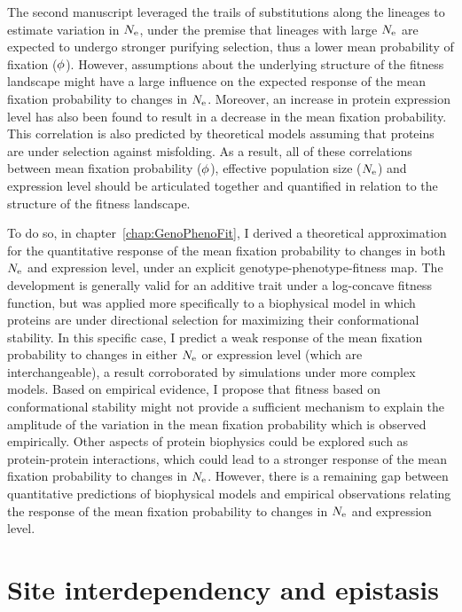The second manuscript leveraged the trails of substitutions along the lineages to estimate variation in $N_{\textrm{e}}$, under the premise that lineages with large $N_{\textrm{e}}$ are expected to undergo stronger purifying selection, thus a lower mean probability of fixation ($\phi$).
However, assumptions about the underlying structure of the fitness landscape might have a large influence on the expected response of the mean fixation probability to changes in $N_{\textrm{e}}$.
Moreover, an increase in protein expression level has also been found to result in a decrease in the mean fixation probability.
This correlation is also predicted by theoretical models assuming that proteins are under selection against misfolding.
As a result, all of these correlations between mean fixation probability ($\phi$), effective population size ($N_{\textrm{e}}$) and expression level should be articulated together and quantified in relation to the structure of the fitness landscape.

To do so, in chapter~\ref{chap:GenoPhenoFit}, I derived a theoretical approximation for the quantitative response of the mean fixation probability to changes in both $N_{\textrm{e}}$ and expression level, under an explicit genotype-phenotype-fitness map.
The development is generally valid for an additive trait under a log-concave fitness function, but was applied more specifically to a biophysical model in which proteins are under directional selection for maximizing their conformational stability.
In this specific case, I predict a weak response of the mean fixation probability to changes in either $N_{\textrm{e}}$ or expression level (which are interchangeable), a result corroborated by simulations under more complex models.
Based on empirical evidence, I propose that fitness based on conformational stability might not provide a sufficient mechanism to explain the amplitude of the variation in the mean fixation probability which is observed empirically.
Other aspects of protein biophysics could be explored such as protein-protein interactions, which could lead to a stronger response of the mean fixation probability to changes in $N_{\textrm{e}}$.
However, there is a remaining gap between quantitative predictions of biophysical models and empirical observations relating the response of the mean fixation probability to changes in $N_{\textrm{e}}$ and expression level.


\section{Site interdependency and epistasis}
\label{sec:epistasis-and-entrenchment}

